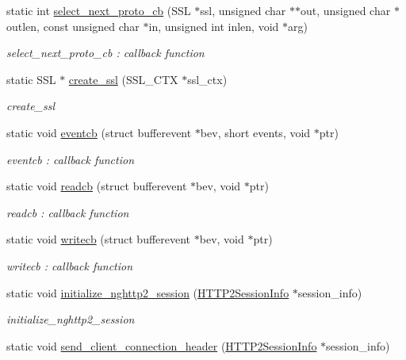 \begin{DoxyCompactItemize}
static int \hyperlink{classhttp2_1_1HTTP2_a1d633dffb2f6d57f202c0a65353ecd28}{select\+\_\+next\+\_\+proto\+\_\+cb} (S\+SL $\ast$ssl, unsigned char $\ast$$\ast$out, unsigned char $\ast$outlen, const unsigned char $\ast$in, unsigned int inlen, void $\ast$arg)
\begin{DoxyCompactList}\small\item\em select\+\_\+next\+\_\+proto\+\_\+cb \+: callback function \end{DoxyCompactList}\item 
static S\+SL $\ast$ \hyperlink{classhttp2_1_1HTTP2_a85c98f99f777e47a20994843c64152e5}{create\+\_\+ssl} (S\+S\+L\+\_\+\+C\+TX $\ast$ssl\+\_\+ctx)
\begin{DoxyCompactList}\small\item\em create\+\_\+ssl \end{DoxyCompactList}\item 
static void \hyperlink{classhttp2_1_1HTTP2_a2ada77b5a33fcfd42f90133c1646f647}{eventcb} (struct bufferevent $\ast$bev, short events, void $\ast$ptr)
\begin{DoxyCompactList}\small\item\em eventcb \+: callback function \end{DoxyCompactList}\item 
static void \hyperlink{classhttp2_1_1HTTP2_a4008245ee6506e4e078cfdd76e2d4da8}{readcb} (struct bufferevent $\ast$bev, void $\ast$ptr)
\begin{DoxyCompactList}\small\item\em readcb \+: callback function \end{DoxyCompactList}\item 
static void \hyperlink{classhttp2_1_1HTTP2_a5f9d1c3a2216305f7b13164e8f8f734c}{writecb} (struct bufferevent $\ast$bev, void $\ast$ptr)
\begin{DoxyCompactList}\small\item\em writecb \+: callback function \end{DoxyCompactList}\item 
static void \hyperlink{classhttp2_1_1HTTP2_a995dc8813f1204a5d541a293bfda2197}{initialize\+\_\+nghttp2\+\_\+session} (\hyperlink{classhttp2_1_1HTTP2SessionInfo}{H\+T\+T\+P2\+Session\+Info} $\ast$session\+\_\+info)
\begin{DoxyCompactList}\small\item\em initialize\+\_\+nghttp2\+\_\+session \end{DoxyCompactList}\item 
static void \hyperlink{classhttp2_1_1HTTP2_a1f9a796a0b9feb26d6f3e16f21bf26bd}{send\+\_\+client\+\_\+connection\+\_\+header} (\hyperlink{classhttp2_1_1HTTP2SessionInfo}{H\+T\+T\+P2\+Session\+Info} $\ast$session\+\_\+info)
$$
\end{DoxyCompactItemize}

